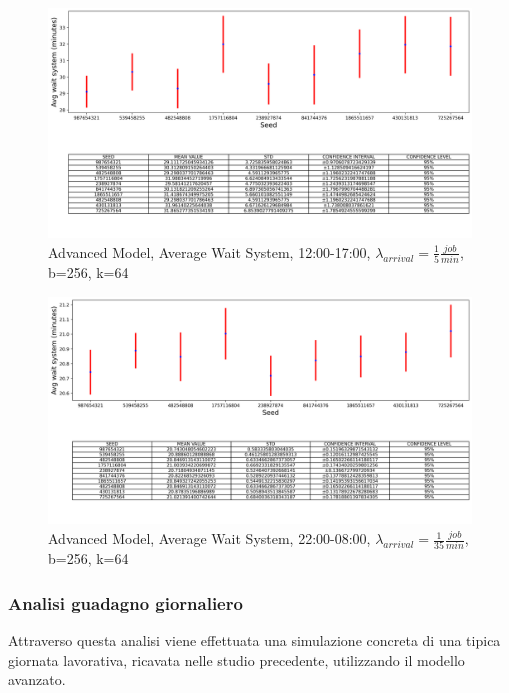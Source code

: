 \documentclass{article}
\begin{document}
\begin{figure}[H]
	\centering
	\captionsetup{justification=centering,margin=2cm}
	\includegraphics[scale=0.48]{images/adv_avg_ws_steady_state_aft.png}
	\caption{Advanced Model, Average Wait System, 12:00-17:00, $\lambda_{arrival}=\frac{1}{5} \frac{job}{min}$, b=256, k=64}\label{figura:adv_avg_ws_steady_state_aft}
\end{figure}

\begin{figure}[H]
	\centering
	\captionsetup{justification=centering,margin=2cm}
	\includegraphics[scale=0.48]{images/adv_avg_ws_steady_state_night.png}
	\caption{Advanced Model, Average Wait System, 22:00-08:00, $\lambda_{arrival}=\frac{1}{35} \frac{job}{min}$, b=256, k=64}\label{figura:adv_avg_ws_steady_state_night}
\end{figure}

\subsubsection{Analisi guadagno giornaliero}
Attraverso questa analisi viene effettuata una simulazione concreta di una tipica giornata lavorativa, ricavata nelle studio precedente, utilizzando il modello avanzato.

\end{document}
